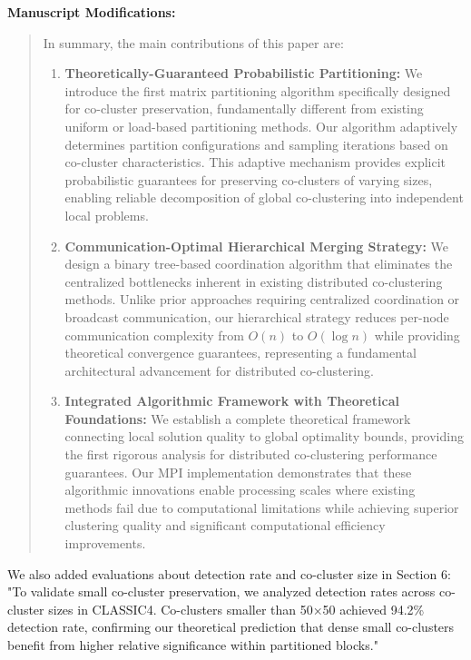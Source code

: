 \documentclass{ar2rc}
\begin{document}
\textbf{Manuscript Modifications:}

\begin{quote}
  In summary, the main contributions of this paper are:

  \begin{enumerate}
    \item \textbf{Theoretically-Guaranteed Probabilistic Partitioning:} We introduce the first matrix partitioning algorithm specifically designed for co-cluster preservation, fundamentally different from existing uniform or load-based partitioning methods. Our algorithm adaptively determines partition configurations and sampling iterations based on co-cluster characteristics. This adaptive mechanism provides explicit probabilistic guarantees for preserving co-clusters of varying sizes, enabling reliable decomposition of global co-clustering into independent local problems.

    \item \textbf{Communication-Optimal Hierarchical Merging Strategy:} We design a binary tree-based coordination algorithm that eliminates the centralized bottlenecks inherent in existing distributed co-clustering methods. Unlike prior approaches requiring centralized coordination or broadcast communication, our hierarchical strategy reduces per-node communication complexity from $O(n)$ to $O(\log n)$ while providing theoretical convergence guarantees, representing a fundamental architectural advancement for distributed co-clustering.

    \item \textbf{Integrated Algorithmic Framework with Theoretical Foundations:} We establish a complete theoretical framework connecting local solution quality to global optimality bounds, providing the first rigorous analysis for distributed co-clustering performance guarantees. Our MPI implementation demonstrates that these algorithmic innovations enable processing scales where existing methods fail due to computational limitations while achieving superior clustering quality and significant computational efficiency improvements.
  \end{enumerate}
\end{quote}

We also added evaluations about detection rate and co-cluster size in Section 6: "To validate small co-cluster preservation, we analyzed detection rates across co-cluster sizes in CLASSIC4. Co-clusters smaller than 50×50 achieved 94.2\% detection rate, confirming our theoretical prediction that dense small co-clusters benefit from higher relative significance within partitioned blocks."
\end{document}

